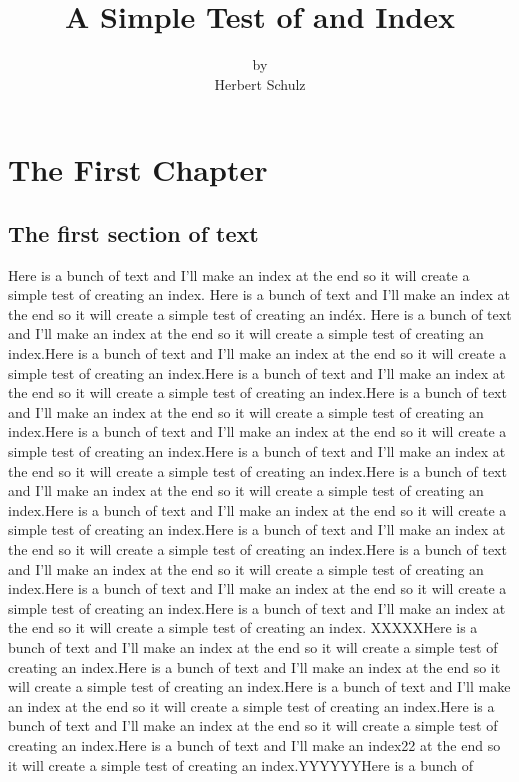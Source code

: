 \documentclass{book}
\title{A Simple Test of and Index}
\author{by\\Herbert Schulz}
\date{}
\begin{document}
\chapter{The First Chapter}

\section{The first section of text}
Here is a bunch of text and I'll make an index at the end so it will create a simple test of creating an index. Here is a bunch of text and I'll make an index at the end so it will create a simple test of creating an indéx. Here is a bunch of text and I'll make an index at the end so it will create a simple test of creating an index.Here is a bunch of text and I'll make an index at the end so it will create a simple test of creating an index.Here is a bunch of text and I'll make an index at the end so it will create a simple test of creating an index.Here is a bunch of text and I'll make an index at the end so it will create a simple test of creating an index.Here is a bunch of text and I'll make an index at the end so it will create a simple test of creating an index.Here is a bunch of text and I'll make an index at the end so it will create a simple test of creating an index.Here is a bunch of text and I'll make an index at the end so it will create a simple test of creating an index.Here is a bunch of text and I'll make an index at the end so it will create a simple test of creating an index.Here is a bunch of text and I'll make an index at the end so it will create a simple test of creating an index.Here is a bunch of text and I'll make an index at the end so it will create a simple test of creating an index.Here is a bunch of text and I'll make an index at the end so it will create a simple test of creating an index.Here is a bunch of text and I'll make an index at the end so it will create a simple test of creating an index. XXXXXHere is a bunch of text and I'll make an index at the end so it will create a simple test of creating an index.Here is a bunch of text and I'll make an index at the end so it will create a simple test of creating an index.Here is a bunch of text and I'll make an index at the end so it will create a simple test of creating an index.Here is a bunch of text and I'll make an index at the end so it will create a simple test of creating an index.Here is a bunch of text and I'll make an index22 at the end so it will create a simple test of creating an index.YYYYYYHere is a bunch of 
\end{document}
